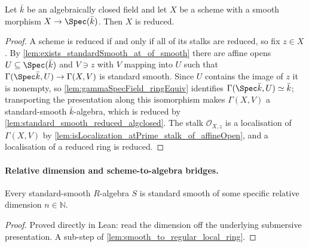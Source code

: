 \begin{lemma}
  \label{lem:smooth_scheme_reduced_algclosed}
  Let \(\bar k\) be an algebraically closed field and let \(X\) be a scheme with
  a smooth morphism \(X \to \Spec(\bar k)\). Then \(X\) is reduced.
\end{lemma}

\begin{proof}
  A scheme is reduced if and only if all of its stalks are reduced, so fix
  \(z \in X\). By \cref{lem:exists_standardSmooth_at_of_smooth} there are affine
  opens \(U \subseteq \Spec(\bar k)\) and \(V \ni z\) with \(V\) mapping into
  \(U\) such that \(\Gamma(\Spec \bar k, U) \to \Gamma(X, V)\) is standard
  smooth. Since \(U\) contains the image of \(z\) it is nonempty, so
  \cref{lem:gammaSpecField_ringEquiv} identifies
  \(\Gamma(\Spec \bar k, U) \simeq \bar k\); transporting the presentation along
  this isomorphism makes \(\Gamma(X, V)\) a standard-smooth
  \(\bar k\)-algebra, which is reduced by
  \cref{lem:standard_smooth_reduced_algclosed}. The stalk
  \(\mathcal O_{X,z}\) is a localisation of \(\Gamma(X, V)\) by
  \cref{lem:isLocalization_atPrime_stalk_of_affineOpen}, and a localisation of
  a reduced ring is reduced.
\end{proof}

\paragraph{Relative dimension and scheme-to-algebra bridges.}

\begin{lemma}
  \label{lem:exists_standardSmoothOfRelativeDimension_of_standardSmooth}
  Every standard-smooth \(R\)-algebra \(S\) is standard smooth of some specific
  relative dimension \(n \in \mathbb N\).
\end{lemma}

\begin{proof}
  Proved directly in Lean: read the dimension off the underlying submersive
  presentation. A sub-step of \cref{lem:smooth_to_regular_local_ring}.
\end{proof}


